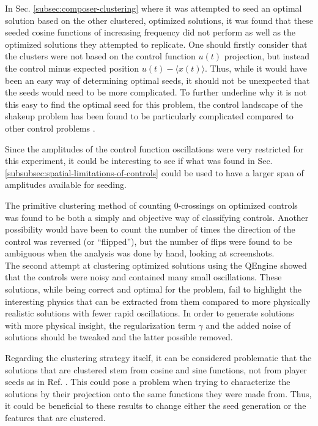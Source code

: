 \documentclass[a4paper, twocolumn]{revtex4-1}
\begin{document}
In Sec. \ref{subsec:composer-clustering} where it was attempted to seed an optimal solution based on the other clustered, optimized solutions, it was found that these seeded cosine functions of increasing frequency did not perform as well as the optimized solutions they attempted to replicate. One should firstly consider that the clusters were not based on the control function $u(t)$ projection, but instead the control minus expected position $u(t) - \langle x(t)\rangle$. Thus, while it would have been an easy way of determining optimal seeds, it should not be unexpected that the seeds would need to be more complicated. To further underline why it is not this easy to find the optimal seed for this problem, the control landscape of the shakeup problem has been found to be particularly complicated compared to other control problems \cite{PhysRevA.90.033628, QM2Paper}.

Since the amplitudes of the control function oscillations were very restricted for this experiment, it could be interesting to see if what was found in Sec. \ref{subsubsec:spatial-limitations-of-controls} could be used to have a larger span of amplitudes available for seeding.

The primitive clustering method of counting 0-crossings on optimized controls was found to be both a simply and objective way of classifying controls. Another possibility would have been to count the number of times the direction of the control was reversed (or ``flipped''), but the number of flips were found to be ambiguous when the analysis was done by hand, looking at screenshots.\\

The second attempt at clustering optimized solutions using the QEngine showed that the controls were noisy and contained many small oscillations. These solutions, while being correct and optimal for the problem, fail to highlight the interesting physics that can be extracted from them compared to more physically realistic solutions with fewer rapid oscillations. In order to generate solutions with more physical insight, the regularization term $\gamma$ and the added noise of solutions should be tweaked and the latter possible removed. 

Regarding the clustering strategy itself, it can be considered problematic that the solutions that are clustered stem from cosine and sine functions, not from player seeds as in Ref. \cite{QM2Paper}. This could pose a problem when trying to characterize the solutions by their projection onto the same functions they were made from. Thus, it could be beneficial to these results to change either the seed generation or the features that are clustered.
\end{document}
